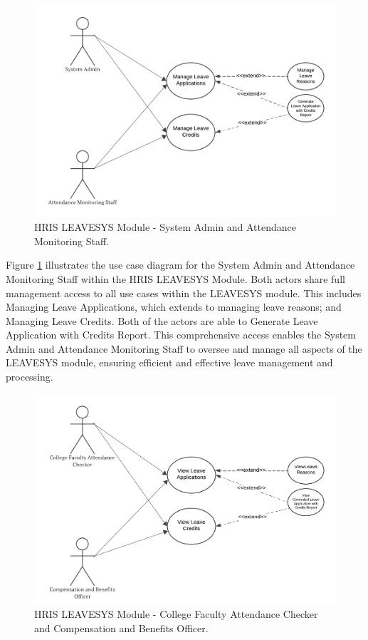     \begin{figure}[H]
        \centering
        \includegraphics[width=0.9\linewidth]{figures/images/diagrams/usecase/use-case-leave-1.png}
        \caption{HRIS LEAVESYS Module - System Admin and Attendance Monitoring Staff.}
        \label{fig:use-case-leave-1}
    \end{figure}

    Figure \ref{fig:use-case-leave-1} illustrates the use case diagram for the System Admin and Attendance Monitoring Staff within the HRIS LEAVESYS Module. Both actors share full management access to all use cases within the LEAVESYS module. This includes Managing Leave Applications, which extends to managing leave reasons; and Managing Leave Credits. Both of the actors are able to Generate Leave Application with Credits Report. This comprehensive access enables the System Admin and Attendance Monitoring Staff to oversee and manage all aspects of the LEAVESYS module, ensuring efficient and effective leave management and processing.

    \begin{figure}[H]
        \centering
        \includegraphics[width=0.9\linewidth]{figures/images/diagrams/usecase/use-case-leave-2.png}
        \caption{HRIS LEAVESYS Module - College Faculty Attendance Checker and Compensation and Benefits Officer.}
        \label{fig:use-case-leave-2}
    \end{figure}

